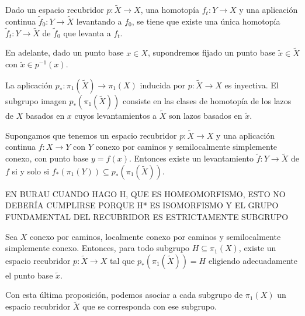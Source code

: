 \documentclass[TFG.tex]{subfiles}
\begin{document}
\begin{prop}
Dado un espacio recubridor $p:\tilde{X}\to X$, una homotopía $f_t:Y\to X$ y una aplicación continua $\tilde{f}_0:Y\to\tilde{X}$ levantando a $f_0$, se tiene que existe una única homotopía $\tilde{f}_t:Y\to\tilde{X}$ de $\tilde{f}_0$ que levanta a $f_t$.
\end{prop}

En adelante, dado un punto base $x\in X$, supondremos fijado un punto base $\tilde{x}\in\tilde{X}$ con $\tilde{x}\in p^{-1}(x)$.

\begin{prop}\label{inyect}
La aplicación $p_*:\pi_1(\tilde{X})\to\pi_1(X)$ inducida por $p:\tilde{X}\to X$ es inyectiva. El subgrupo imagen $p_*(\pi_1(\tilde{X}))$ consiste en las clases de homotopía de los lazos de $X$ basados en $x$ cuyos levantamientos a $\tilde{X}$ son lazos basados en $\tilde{x}$.
\end{prop}

\begin{prop}
Supongamos que tenemos un espacio recubridor $p:\tilde{X}\to X$ y una aplicación continua $f:X\to Y$ con $Y$ conexo por caminos y semilocalmente simplemente conexo, con punto base $y=f(x)$. Entonces existe un levantamiento $\tilde{f}:Y\to\tilde{X}$ de $f$ si y solo si $f_*(\pi_1(Y))\subseteq p_*(\pi_1(\tilde{X}))$.
\end{prop}
EN BURAU CUANDO HAGO H, QUE ES HOMEOMORFISMO, ESTO NO DEBERÍA CUMPLIRSE PORQUE H* ES ISOMORFISMO Y EL GRUPO FUNDAMENTAL DEL RECUBRIDOR ES ESTRICTAMENTE SUBGRUPO

\begin{prop}
Sea $X$ conexo por caminos, localmente conexo por caminos y semilocalmente simplemente conexo. Entonces, para todo subgrupo $H\subseteq \pi_1(X)$, existe un espacio recubridor $p:\tilde{X}\to X$ tal que $p_*(\pi_1(\tilde{X}))=H$ eligiendo adecuadamente el punto base $\tilde{x}$. 
\end{prop}

Con esta última proposición, podemos asociar a cada subgrupo de $\pi_1(X)$ un espacio recubridor $\tilde{X}$ que se corresponda con ese subgrupo.

\end{document}

